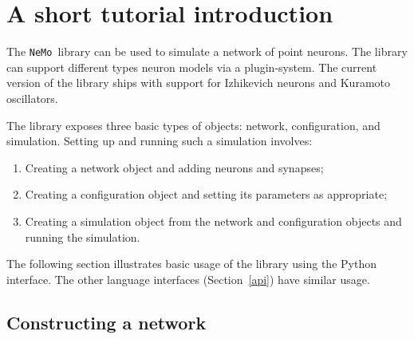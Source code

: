 \documentclass[a4paper]{article}
\newcommand{\nemo}{\texttt{NeMo}}
\newcommand{\cpp}{C\nolinebreak\hspace{-.05em}\raisebox{.4ex}{\tiny\bf +}\nolinebreak\hspace{-.10em}\raisebox{.4ex}{\tiny\bf +}}
\begin{document}
\maketitle

\begin{abstract}

\nemo\ is a library for discrete-time simulation of spiking neural networks. 
It is aimed at real-time simulation of tens of thousands of neurons on a single workstation.
\nemo\ runs on parallel hardware;
	In particular it can run on CUDA-enabled GPUs.
No parallel programming is required, however, on the part of the end user,
	as parallelisation is handled by the library.
The library has interfaces in \cpp, C, Python, and Matlab.

\end{abstract}



\section{A short tutorial introduction}

The \nemo\ library can be used to simulate a network of point neurons.
The library can support different types neuron models via a plugin-system.
The current version of the library ships with support for 
Izhikevich neurons \cite{izhikevich2003simple_model} 
and Kuramoto oscillators.

The library exposes three basic types of objects:
	network, configuration, and simulation.
Setting up and running such a simulation involves:

\begin{enumerate}
	\item Creating a network object and adding neurons and synapses;
	\item Creating a configuration object and setting its parameters as appropriate;
	\item Creating a simulation object from the network and configuration objects and running the simulation.
\end{enumerate}

The following section illustrates basic usage of the library using the Python interface.
The other language interfaces (Section~\ref{api}) have similar usage.

\subsection{Constructing a network}
\end{document}

